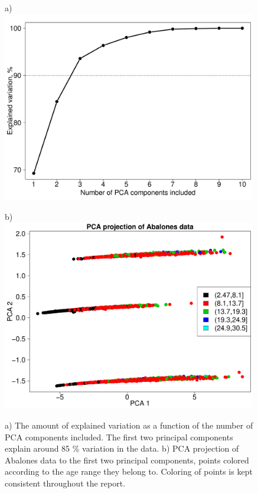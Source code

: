 \documentclass[10pt, paper=a4]{article}
\begin{document}
\begin{figure}[h!]
  \begin{minipage}{0.49\textwidth}
    a)\\
    \includegraphics[width = 0.99\textwidth]{PCA_Variation.pdf}
  \end{minipage} \hfill
  \begin{minipage}{0.49\textwidth}
    b)\\
    \includegraphics[width = 0.99\textwidth]{PCA_Projection.pdf}
  \end{minipage} \vfill
  \caption{a) The amount of explained variation as a function of the number of
    PCA components included.  The first two principal components explain around
    85 \% variation in the data. b) PCA projection of Abalones data to the first
    two principal components, points colored according to the age range they
    belong to.  Coloring of points is kept consistent throughout the report.}
  \label{fig:pca}
\end{figure}
\end{document}
